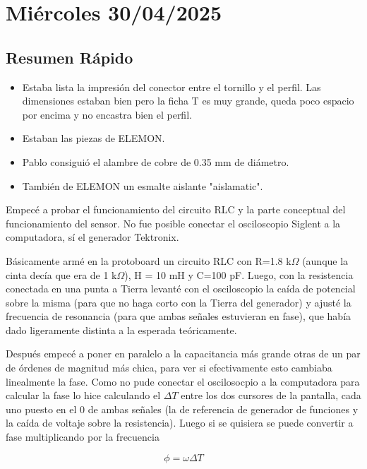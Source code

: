 
\section{Miércoles 30/04/2025}

\subsection*{Resumen Rápido}

\begin{itemize}
	\item Estaba lista la impresión del conector entre el tornillo y el perfil. Las dimensiones estaban bien pero la ficha T es muy grande, queda poco espacio por encima y no encastra bien el perfil.
	\item Estaban las piezas de ELEMON.
	\item Pablo consiguió el alambre de cobre de 0.35 mm de diámetro.
	\item También de ELEMON un esmalte aislante "aislamatic".
\end{itemize}

Empecé a probar el funcionamiento del circuito RLC y la parte conceptual del funcionamiento del sensor. No fue posible conectar el osciloscopio Siglent a la computadora, sí el generador Tektronix. 

Básicamente armé en la protoboard un circuito RLC con R=1.8 k$\Omega$ (aunque la cinta decía que era de 1 k$\Omega$), H = 10 mH y C=100 pF. Luego, con la resistencia conectada en una punta a Tierra levanté con el osciloscopio la caída de potencial sobre la misma (para que no haga corto con la Tierra del generador) y ajusté la frecuencia de resonancia (para que ambas señales estuvieran en fase), que había dado ligeramente distinta a la esperada teóricamente. 

Después empecé a poner en paralelo a la capacitancia más grande otras de un par de órdenes de magnitud más chica, para ver si efectivamente esto cambiaba linealmente la fase. Como no pude conectar el oscilosocpio a la computadora para calcular la fase lo hice calculando el $\Delta T$ entre los dos cursores de la pantalla, cada uno puesto en el 0 de ambas señales (la de referencia de generador de funciones y la caída de voltaje sobre la resistencia). Luego si se quisiera se puede convertir a fase multiplicando por la frecuencia 

\begin{equation}
	\phi = \omega \Delta T %
\end{equation}	

